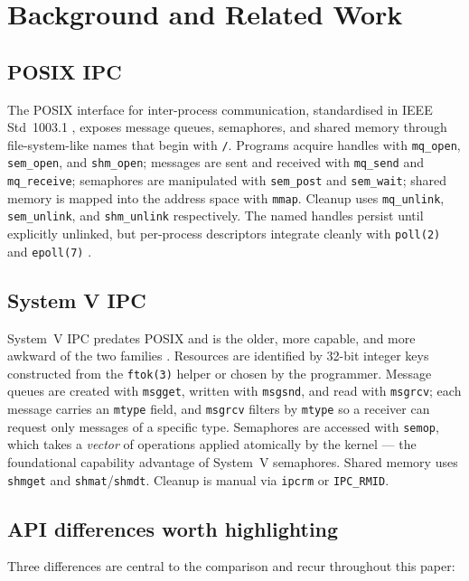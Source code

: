 \documentclass[a4paper,11pt]{article}
\begin{document}
\section{Background and Related Work}
\label{sec:bg}

\subsection{POSIX IPC}
The POSIX interface for inter-process communication, standardised in IEEE
Std~1003.1 \cite{posix2017}, exposes message queues, semaphores, and shared
memory through file-system-like names that begin with \texttt{/}. Programs
acquire handles with \texttt{mq\_open}, \texttt{sem\_open}, and
\texttt{shm\_open}; messages are sent and received with \texttt{mq\_send}
and \texttt{mq\_receive}; semaphores are manipulated with \texttt{sem\_post}
and \texttt{sem\_wait}; shared memory is mapped into the address space with
\texttt{mmap}. Cleanup uses \texttt{mq\_unlink}, \texttt{sem\_unlink}, and
\texttt{shm\_unlink} respectively. The named handles persist until
explicitly unlinked, but per-process descriptors integrate cleanly with
\texttt{poll(2)} and \texttt{epoll(7)} \cite{linux_mq_overview}.

\subsection{System V IPC}
System~V IPC predates POSIX and is the older, more capable, and more
awkward of the two families \cite{stevens1999, linux_sysvipc}. Resources
are identified by 32-bit integer keys constructed from the
\texttt{ftok(3)} helper or chosen by the programmer. Message queues are
created with \texttt{msgget}, written with \texttt{msgsnd}, and read with
\texttt{msgrcv}; each message carries an \texttt{mtype} field, and
\texttt{msgrcv} filters by \texttt{mtype} so a receiver can request only
messages of a specific type. Semaphores are accessed with \texttt{semop},
which takes a \emph{vector} of operations applied atomically by the kernel
--- the foundational capability advantage of System~V semaphores. Shared
memory uses \texttt{shmget} and \texttt{shmat}/\texttt{shmdt}. Cleanup is
manual via \texttt{ipcrm} or \texttt{IPC\_RMID}.

\subsection{API differences worth highlighting}
Three differences are central to the comparison and recur throughout this
paper:
\end{document}
